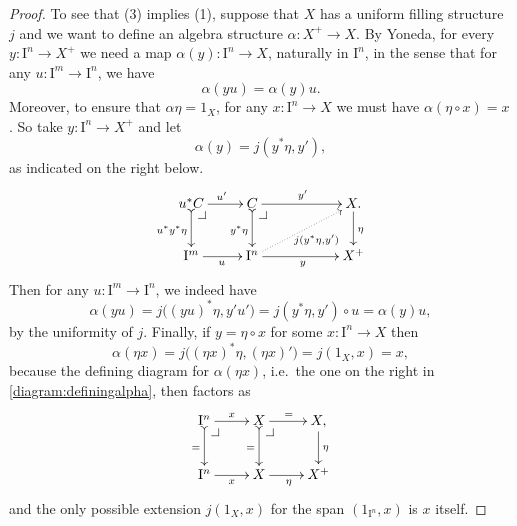 \documentclass[12pt]{article}
\makeatletter
\newcommand{\ra}{\ensuremath{\rightarrow}}
\newcommand{\I}{\ensuremath{\mathrm{I}}}
\theoremstyle{remark}
\theoremstyle{definition}
\newcommand{\pbcorner}[1][dr]{\save*!/#1-1.2pc/#1:(-1,1)@^{|-}\restore}
\makeatother
\begin{document}
\begin{proof}
To see that (3) implies (1), suppose that $X$ has a uniform filling structure $j$ and we want to define an algebra structure $\alpha : X^+ \ra X$. By Yoneda, for every $y : \I^n \ra X^+$ we need a map $\alpha(y) : \I^n \ra X$, naturally in $\I^n$, in the sense that for any $u : \I^m \ra \I^n$, we have
\begin{equation}\label{eq:proof,plusstructure}
\alpha(yu) = \alpha(y)u.
\end{equation}
Moreover, to ensure that $\alpha\eta = 1_X$, for any $x : \I^n \ra X$ we must have $\alpha(\eta\circ x) = x$. So take $y : \I^n \ra X^+$  and let $$\alpha(y) = j(y^*\eta, y'),$$
as indicated on the right below.
\begin{equation}\label{diagram:definingalpha}
\xymatrix{
u^*C \ar@{>->}[d]_{u^*y^*\eta} \ar[r]^{u'} \pbcorner &  C \ar@{>->}[d]_{y^*\eta} \ar[rr]^{y'}\pbcorner && X \ar[d]^\eta . \\
\I^{m} \ar[r]_{u} & \I^{n} \ar@{.>}[rru]_{j(y^*\eta,y')} \ar[rr]_{y} && X^+
}
\end{equation}
Then for any $u : \I^m \ra \I^n$, we indeed have 
$$\alpha(yu) =  j\big( (yu)^*\eta, y'u' \big) = j(y^*\eta, y')\circ u = \alpha(y)u,$$
 by the uniformity of $j$. Finally, if $y=\eta\circ x$ for some $x : \I^n\ra X$ then 
 $$\alpha(\eta x) =  j\big( (\eta x)^*\eta, (\eta x)'\big) = j(1_X, x) = x,$$
 because the defining diagram for $\alpha(\eta x)$, i.e.\ the one on the right in \eqref{diagram:definingalpha}, then factors as
 \begin{equation}\label{diagram:definingalphatwo}
\xymatrix{
\I^n \ar@{>->}[d]_{=} \ar[r]^{x} \pbcorner &  X \ar@{>->}[d]_{=} \ar[r]^{=}\pbcorner & X \ar[d]^\eta , \\
\I^{n} \ar[r]_{x} & X  \ar[r]_{\eta} & X^+
}
\end{equation}
and the only possible extension $j(1_X, x)$ for the span $(1_{\I^n}, x)$ is  $x$ itself.
 \end{proof}
 
\end{document}
